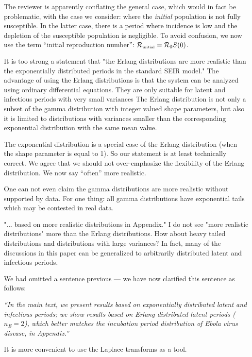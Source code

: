 \documentclass[12pt]{article}
\newcommand{\Rx}[1]{\ensuremath{{\cal R}_{#1}}}
\newcommand{\Ro}{\Rx{0}}
\newcommand{\Rini}{\Rx{\textrm{\tiny initial}}}
\newcommand{\revtext}{\textsf}
\newcommand{\newtext}[1]{\textsl{``#1''}}
\begin{document}
The reviewer is apparently conflating the general case, which would in fact be problematic, with the case we consider: where the \emph{initial} population is not fully susceptible. In the latter case, there is a period where incidence is low and the depletion of the susceptible population is negligible.
To avoid confusion, we now use the term ``initial reproduction number'': $\Rini = \Ro S(0)$.

\revtext{
 It is too strong a statement that "the Erlang distributions are
more realistic than the exponentially distributed periods in the standard
SEIR model." The advantage of using the Erlang distributions is that the
system can be analyzed using ordinary differential equations. They are
only suitable for latent and infectious periods with very small variances
The Erlang distribution is not only a subset of the gamma distribution with integer valued shape parameters, but also it is limited to distributions with variances smaller than the corresponding exponential distribution with the same mean value.
}

The exponential distribution is a special case of the Erlang distribution (when the shape parameter is equal to 1). So our statement is at least technically correct.
We agree that we should not over-emphasize the flexibility of the Erlang distribution.
We now say ``often'' more realistic.

\revtext{
One can not even claim the gamma distributions are more realistic
without supported by data. For one thing: all gamma distributions
have exponential tails which may be contested in real data.
}

\revtext{
"... based on more realistic distributions in Appendix." I do
not see "more realistic distributions" more than the Erlang distributions.
How about heavy tailed distributions and distributions with large variances? In fact, many of the discussions in this paper can be generalized
to arbitrarily distributed latent and infectious periods.
}

We had omitted a sentence previous --- we have now clarified this sentence as follows:

\newtext{In the main text, we present results based on exponentially distributed latent and infectious periods;
we show results based on Erlang distributed latent periods ($n_E=2$), which better matches the incubation period distribution of Ebola virus disease, in Appendix.}

\revtext{
It is more convenient to use the Laplace transforms as a tool.
}
\end{document}
